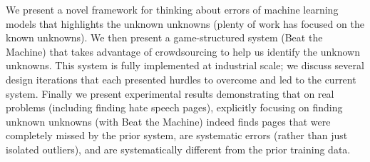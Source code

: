 We present a novel framework for thinking about errors of machine learning models that highlights the unknown unknowns (plenty of work has focused on the known unknowns).  We then present a game-structured system (Beat the Machine) that takes advantage of crowdsourcing to help us identify the unknown unknowns.  This system is fully implemented at industrial scale; we discuss several design iterations that each presented hurdles to overcome and led to the current system.  Finally we present experimental results demonstrating that on real problems (including finding hate speech pages), explicitly focusing on finding unknown unknowns (with Beat the Machine) indeed finds pages that were completely missed by the prior system, are systematic errors (rather than just isolated outliers), and are systematically different from the prior training data. 

